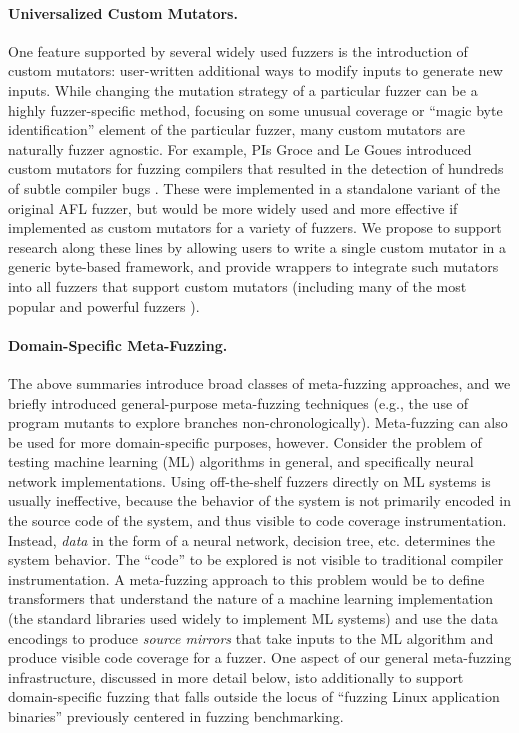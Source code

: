 \paragraph{Universalized Custom Mutators.}  One feature supported by several 
widely used fuzzers is the introduction of custom mutators:  user-written 
additional ways to modify inputs to generate new inputs.  While changing the 
mutation strategy of a particular fuzzer can be a highly fuzzer-specific 
method, focusing on some unusual coverage or ``magic byte identification'' 
element of the particular fuzzer, many custom mutators are naturally fuzzer 
agnostic.  For example, PIs Groce and Le Goues introduced custom mutators for 
fuzzing compilers that resulted in the detection of hundreds of subtle compiler 
bugs \cite{CC22}.  These were implemented in a standalone variant of the 
original AFL fuzzer, but would be more widely used and more effective if 
implemented as custom mutators for a variety of fuzzers.  We propose to support 
research along these lines by allowing users to write a single custom mutator 
in a generic byte-based framework, and provide wrappers to integrate such 
mutators into all fuzzers that support custom mutators (including many of the 
most popular and powerful fuzzers ).
   
\paragraph{Domain-Specific Meta-Fuzzing.} The above summaries introduce 
broad classes of meta-fuzzing approaches, and we briefly introduced  
general-purpose meta-fuzzing techniques (e.g., the use of program mutants to 
explore branches non-chronologically).  Meta-fuzzing can also be used for more 
domain-specific purposes, however.  Consider the problem of testing machine 
learning (ML) algorithms in general, and specifically neural network 
implementations.  Using off-the-shelf fuzzers directly on ML systems is usually 
ineffective, because the behavior of the system is not primarily encoded in the 
source code of the system, and thus visible to code coverage instrumentation.  
Instead, \emph{data} in the form of a neural network, decision tree, etc. 
determines the system behavior.  The ``code'' to be explored is not visible to 
traditional compiler instrumentation.  A meta-fuzzing approach to this problem 
would be to define transformers that understand the nature of a machine 
learning implementation (the standard libraries used widely to implement ML 
systems) and use the data encodings to produce \emph{source mirrors} that take 
inputs to the ML algorithm and produce visible code coverage for a fuzzer.  One 
aspect of our general meta-fuzzing infrastructure, discussed in more detail 
below, isto additionally to support domain-specific fuzzing that falls outside 
the locus of ``fuzzing Linux application binaries'' previously centered in 
fuzzing benchmarking.


